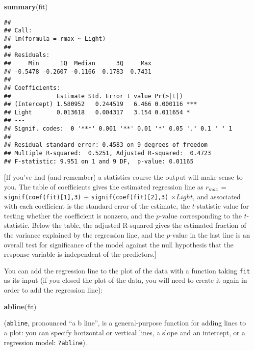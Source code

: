 \documentclass[11pt,]{article}
\newenvironment{Shaded}{\begin{snugshade}}{\end{snugshade}}
\newcommand{\KeywordTok}[1]{\textcolor[rgb]{0.13,0.29,0.53}{\textbf{#1}}}
\newcommand{\NormalTok}[1]{#1}
\begin{document}
\begin{Shaded}
\begin{Highlighting}[]
\KeywordTok{summary}\NormalTok{(fit)}
\end{Highlighting}
\end{Shaded}

\begin{verbatim}
## 
## Call:
## lm(formula = rmax ~ Light)
## 
## Residuals:
##     Min      1Q  Median      3Q     Max 
## -0.5478 -0.2607 -0.1166  0.1783  0.7431 
## 
## Coefficients:
##             Estimate Std. Error t value Pr(>|t|)    
## (Intercept) 1.580952   0.244519   6.466 0.000116 ***
## Light       0.013618   0.004317   3.154 0.011654 *  
## ---
## Signif. codes:  0 '***' 0.001 '**' 0.01 '*' 0.05 '.' 0.1 ' ' 1
## 
## Residual standard error: 0.4583 on 9 degrees of freedom
## Multiple R-squared:  0.5251, Adjusted R-squared:  0.4723 
## F-statistic: 9.951 on 1 and 9 DF,  p-value: 0.01165
\end{verbatim}

{[}If you've had (and remember) a statistics course the output will make
sense to you. The table of coefficients gives the estimated regression
line as \(r_{max}\) = \texttt{signif(coef(fit){[}1{]},3)} +
\texttt{signif(coef(fit){[}2{]},3)} \(\times Light\), and associated
with each coefficient is the standard error of the estimate, the
\(t\)-statistic value for testing whether the coefficient is nonzero,
and the \(p\)-value corresponding to the \(t\)-statistic. Below the
table, the adjusted R-squared gives the estimated fraction of the
variance explained by the regression line, and the \(p\)-value in the
last line is an overall test for significance of the model against the
null hypothesis that the response variable is independent of the
predictors.{]}

You can add the regression line to the plot of the data with a function
taking \texttt{fit} as its input (if you closed the plot of the data,
you will need to create it again in order to add the regression line):

\begin{Shaded}
\begin{Highlighting}[]
\KeywordTok{abline}\NormalTok{(fit)}
\end{Highlighting}
\end{Shaded}

(\texttt{abline}, pronounced ``a b line'', is a general-purpose function
for adding lines to a plot: you can specify horizontal or vertical
lines, a slope and an intercept, or a regression model:
\texttt{?abline}).
\end{document}
